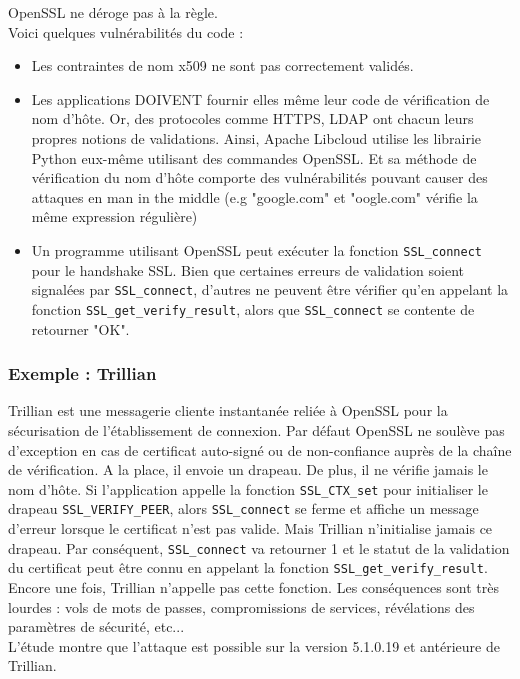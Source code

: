 			OpenSSL ne déroge pas à la règle.\\
			Voici quelques vulnérabilités du code :
			\begin{itemize}
			\item Les contraintes de nom x509 ne sont pas correctement validés.
			\item Les applications DOIVENT fournir elles même leur code de vérification de nom d'hôte. Or, des protocoles comme HTTPS, LDAP ont chacun leurs propres notions de validations. Ainsi, Apache Libcloud utilise les librairie Python eux-même utilisant des commandes OpenSSL. Et sa méthode de vérification du nom d'hôte comporte des vulnérabilités pouvant causer des attaques en man in the middle (e.g "google.com" et "oogle.com" vérifie la même expression régulière)
			\item Un programme utilisant OpenSSL peut exécuter la fonction \texttt{SSL\_connect} pour le handshake SSL. Bien que certaines erreurs de validation soient signalées par \texttt{SSL\_connect}, d'autres ne peuvent être vérifier qu'en appelant la fonction \texttt{SSL\_get\_verify\_result}, alors que \texttt{SSL\_connect} se contente de retourner "OK".
			\end{itemize}

		\subsubsection{Exemple : Trillian}

			Trillian est une messagerie cliente instantanée	reliée à OpenSSL pour la sécurisation de l'établissement de connexion. Par défaut OpenSSL ne soulève pas d'exception en cas de certificat auto-signé ou de non-confiance auprès de la chaîne de vérification. A la place, il envoie un drapeau. De plus, il ne vérifie jamais le nom d'hôte.	Si l'application appelle la fonction \texttt{SSL\_CTX\_set} pour initialiser le drapeau \texttt{SSL\_VERIFY\_PEER}, alors \texttt{SSL\_connect} se ferme et affiche un message d'erreur lorsque le certificat n'est pas valide.	Mais Trillian n'initialise jamais ce drapeau.	Par conséquent, \texttt{SSL\_connect} va retourner 1 et le statut de la validation du certificat peut être connu en appelant la fonction \texttt{SSL\_get\_verify\_result}.	Encore une fois, Trillian n'appelle pas cette fonction.	Les conséquences sont très lourdes : vols de mots de passes, compromissions de services, révélations des paramètres de sécurité, etc...\\
			

			L'étude montre que l'attaque est possible sur la version 5.1.0.19 et antérieure de Trillian.

